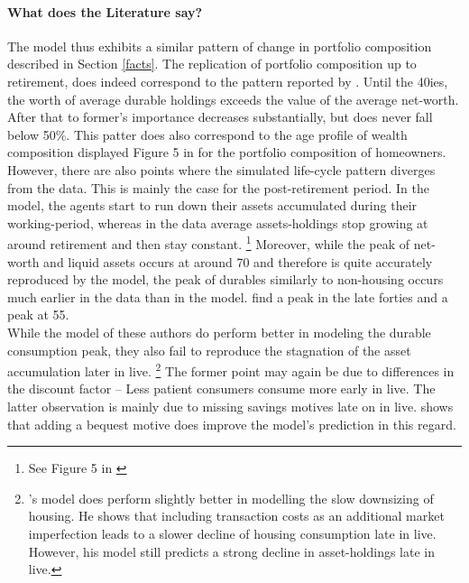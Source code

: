 \documentclass[a4paper,12pt,legno]{article}
\begin{document}
\paragraph{What does the Literature say?} The model thus exhibits a similar pattern of change in portfolio composition described in Section \ref{facts}. The replication of portfolio composition up to retirement, does indeed correspond to the pattern reported by \cite{FV&K2011}. Until the 40ies, the worth of average durable holdings exceeds the value of the average net-worth. After that to former's importance decreases substantially, but does never fall below 50\%. This patter does also correspond to the age profile of wealth composition displayed Figure 5 in \cite{yang2009} for the portfolio composition of homeowners. \\ However, there are also points where the simulated life-cycle pattern diverges from the data. This is mainly the case for the post-retirement period. In the model, the agents start to run down their assets accumulated during their working-period, whereas in the data average assets-holdings stop growing at around retirement and then stay constant. \footnote{See Figure 5 in \cite{yang2009}} Moreover, while the peak of net-worth and liquid assets occurs at around 70 and therefore is quite accurately reproduced by the model, the peak of durables similarly to non-housing occurs much earlier in the data than in the model. \citep{FV&K2011} find a peak in the late forties and \citep{yang2009} a peak at 55. \\
While the model of these authors do perform better in modeling the durable consumption peak, they also fail to reproduce the stagnation of the asset accumulation later in live. \footnote{\cite{yang2009}'s model does perform slightly better in modelling the slow downsizing of housing. He shows that including transaction costs as an additional market imperfection leads to a slower decline of housing consumption late in live. However, his model still predicts a strong decline in asset-holdings late in live.} The former point may again be due to differences in the discount factor \--- Less patient consumers consume more early in live. The latter observation is mainly due to missing savings motives late on in live. \cite{de2004wealth} shows that adding a bequest motive does improve the model's prediction in this regard. 
\end{document}
